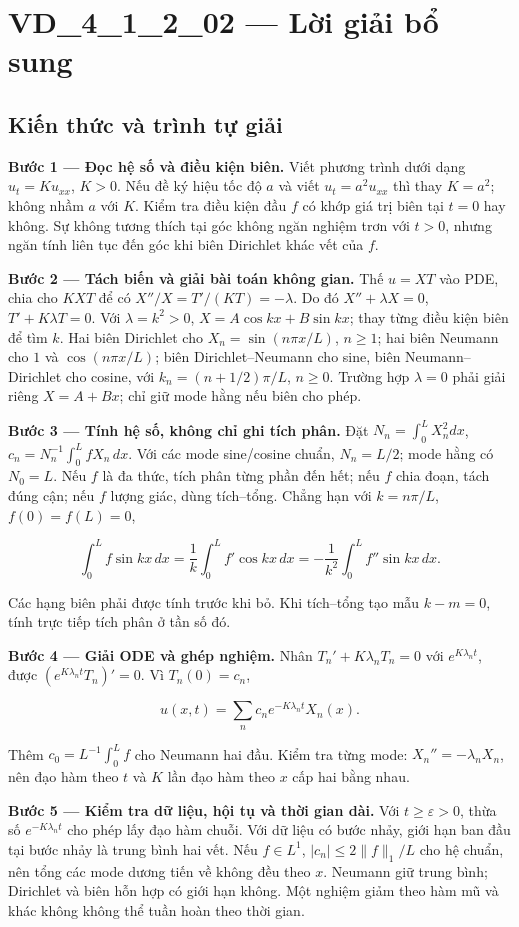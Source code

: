 \documentclass[10pt,a4paper]{article}
\begin{document}
\section*{VD\_4\_1\_2\_02 — Lời giải bổ sung}
\subsection*{Kiến thức và trình tự giải}
\textbf{Bước 1 — Đọc hệ số và điều kiện biên.} Viết phương trình dưới dạng $u_t=Ku_{xx}$, $K>0$. Nếu đề ký hiệu tốc độ $a$ và viết $u_t=a^2u_{xx}$ thì thay $K=a^2$; không nhầm $a$ với $K$. Kiểm tra điều kiện đầu $f$ có khớp giá trị biên tại $t=0$ hay không. Sự không tương thích tại góc không ngăn nghiệm trơn với $t>0$, nhưng ngăn tính liên tục đến góc khi biên Dirichlet khác vết của $f$.

\textbf{Bước 2 — Tách biến và giải bài toán không gian.} Thế $u=XT$ vào PDE, chia cho $KXT$ để có $X''/X=T'/(KT)=-\lambda$. Do đó $X''+\lambda X=0$, $T'+K\lambda T=0$. Với $\lambda=k^2>0$, $X=A\cos kx+B\sin kx$; thay từng điều kiện biên để tìm $k$. Hai biên Dirichlet cho $X_n=\sin(n\pi x/L)$, $n\ge1$; hai biên Neumann cho $1$ và $\cos(n\pi x/L)$; biên Dirichlet–Neumann cho sine, biên Neumann–Dirichlet cho cosine, với $k_n=(n+1/2)\pi/L$, $n\ge0$. Trường hợp $\lambda=0$ phải giải riêng $X=A+Bx$; chỉ giữ mode hằng nếu biên cho phép.

\textbf{Bước 3 — Tính hệ số, không chỉ ghi tích phân.} Đặt $N_n=\int_0^L X_n^2dx$, $c_n=N_n^{-1}\int_0^L fX_n\,dx$. Với các mode sine/cosine chuẩn, $N_n=L/2$; mode hằng có $N_0=L$. Nếu $f$ là đa thức, tích phân từng phần đến hết; nếu $f$ chia đoạn, tách đúng cận; nếu $f$ lượng giác, dùng tích–tổng. Chẳng hạn với $k=n\pi/L$, $f(0)=f(L)=0$,


\[
\int_0^Lf\sin kx\,dx=\frac1k\int_0^Lf'\cos kx\,dx
=-\frac1{k^2}\int_0^Lf''\sin kx\,dx.
\]


Các hạng biên phải được tính trước khi bỏ. Khi tích–tổng tạo mẫu $k-m=0$, tính trực tiếp tích phân ở tần số đó.

\textbf{Bước 4 — Giải ODE và ghép nghiệm.} Nhân $T_n'+K\lambda_nT_n=0$ với $e^{K\lambda_nt}$, được $(e^{K\lambda_nt}T_n)'=0$. Vì $T_n(0)=c_n$,


\[
u(x,t)=\sum_n c_ne^{-K\lambda_nt}X_n(x).
\]


Thêm $c_0=L^{-1}\int_0^Lf$ cho Neumann hai đầu. Kiểm tra từng mode: $X_n''=-\lambda_nX_n$, nên đạo hàm theo $t$ và $K$ lần đạo hàm theo $x$ cấp hai bằng nhau.

\textbf{Bước 5 — Kiểm tra dữ liệu, hội tụ và thời gian dài.} Với $t\ge\varepsilon>0$, thừa số $e^{-K\lambda_nt}$ cho phép lấy đạo hàm chuỗi. Với dữ liệu có bước nhảy, giới hạn ban đầu tại bước nhảy là trung bình hai vết. Nếu $f\in L^1$, $|c_n|\le2\|f\|_1/L$ cho hệ chuẩn, nên tổng các mode dương tiến về không đều theo $x$. Neumann giữ trung bình; Dirichlet và biên hỗn hợp có giới hạn không. Một nghiệm giảm theo hàm mũ và khác không không thể tuần hoàn theo thời gian.
\end{document}
